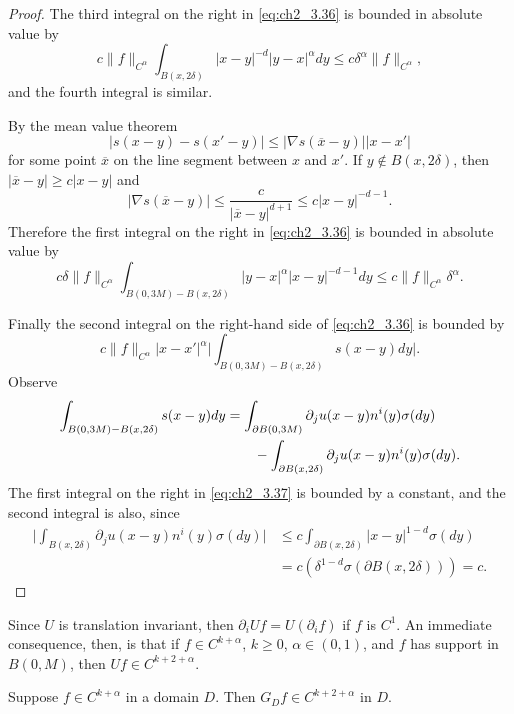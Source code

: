 \begin{proof}
The third integral on the right in \eqref{eq:ch2_3.36} is bounded in absolute value by
\[
    c\|f\|_{C^\alpha} \int_{B(x,2\delta)} |x-y|^{-d}|y-x|^\alpha dy \leq c\delta^\alpha\|f\|_{C^\alpha},
\]
\mnewpage
and the fourth integral is similar.

By the mean value theorem
\[
    |s(x-y) - s(x'-y)| \leq |\nabla s(\overline{x}-y)||x-x'|
\]
for some point $\overline{x}$ on the line segment between $x$ and $x'$. If $y \notin B(x,2\delta)$, then $|\overline{x}-y| \geq c|x-y|$ and
\[
    |\nabla s(\overline{x}-y)| \leq \frac{c}{|\overline{x}-y|^{d+1}} \leq c|x-y|^{-d-1}.
\]
Therefore the first integral on the right in \eqref{eq:ch2_3.36} is bounded in absolute value by
\[
    c\delta\|f\|_{C^\alpha} \int_{B(0,3M)-B(x,2\delta)} |y-x|^\alpha|x-y|^{-d-1}dy \leq c\|f\|_{C^\alpha}\delta^\alpha.
\]

Finally the second integral on the right-hand side of \eqref{eq:ch2_3.36} is bounded by
\[
    c\|f\|_{C^\alpha}|x-x'|^\alpha\Big|\int_{B(0,3M)-B(x,2\delta)} s(x-y)dy\Big|.
\]
Observe
\begin{align}\label{eq:ch2_3.37}
    \int_{B(0,3M)-B(x,2\delta)} s(x-y)dy &= \int_{\partial B(0,3M)} \partial_ju(x-y)n^i(y)\sigma(dy) \\
    &\qquad- \int_{\partial B(x,2\delta)} \partial_ju(x-y)n^i(y)\sigma(dy). \notag
\end{align}
The first integral on the right in \eqref{eq:ch2_3.37} is bounded by a constant, and the second integral is also, since
\begin{align*}
    \Big|\int_{B(x,2\delta)} \partial_ju(x-y)n^i(y)\sigma(dy)\Big| &\leq c\int_{\partial B(x,2\delta)} |x-y|^{1-d}\sigma(dy) \\
    &= c(\delta^{1-d}\sigma(\partial B(x,2\delta))) = c.
\end{align*}
\end{proof}

Since $U$ is translation invariant, then $\partial_iUf = U(\partial_if)$ if $f$ is $C^1$. An immediate consequence, then, is that if $f \in C^{k+\alpha}$, $k \geq 0$, $\alpha \in (0,1)$, and $f$ has support in $B(0,M)$, then $Uf \in C^{k+2+\alpha}$.

\begin{corollary}\label{cor:ch2_3.15}
Suppose $f \in C^{k+\alpha}$ in a domain $D$. Then $G_Df \in C^{k+2+\alpha}$ in $D$.
\end{corollary}


